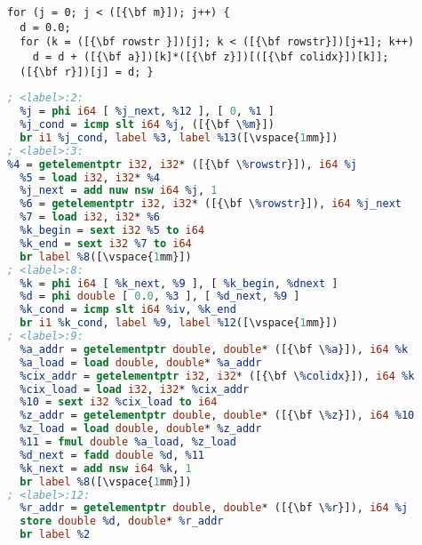 \begin{lstlisting}[language=MyCpp, basicstyle=\linespread{0.75}\small\ttfamily]
for (j = 0; j < ([{\bf m}]); j++) {
  d = 0.0;
  for (k = ([{\bf rowstr }])[j]; k < ([{\bf rowstr}])[j+1]; k++)
    d = d + ([{\bf a}])[k]*([{\bf z}])[([{\bf colidx}])[k]];
  ([{\bf r}])[j] = d; }
\end{lstlisting}
\vspace{-4.4mm}
\begin{lstlisting}[language={LLVM}, basicstyle=\linespread{0.75}\tiny\ttfamily,
                   label={fig:spmvexample1}, caption={Sparse linear algebra in C and LLVM IR}]
; <label>:2:
  %j = phi i64 [ %j_next, %12 ], [ 0, %1 ]
  %j_cond = icmp slt i64 %j, ([{\bf \%m}])
  br i1 %j_cond, label %3, label %13([\vspace{1mm}])
; <label>:3:
%4 = getelementptr i32, i32* ([{\bf \%rowstr}]), i64 %j
  %5 = load i32, i32* %4
  %j_next = add nuw nsw i64 %j, 1
  %6 = getelementptr i32, i32* ([{\bf \%rowstr}]), i64 %j_next
  %7 = load i32, i32* %6
  %k_begin = sext i32 %5 to i64
  %k_end = sext i32 %7 to i64
  br label %8([\vspace{1mm}])
; <label>:8:
  %k = phi i64 [ %k_next, %9 ], [ %k_begin, %dnext ]
  %d = phi double [ 0.0, %3 ], [ %d_next, %9 ]
  %k_cond = icmp slt i64 %iv, %k_end
  br i1 %k_cond, label %9, label %12([\vspace{1mm}])
; <label>:9:
  %a_addr = getelementptr double, double* ([{\bf \%a}]), i64 %k
  %a_load = load double, double* %a_addr
  %cix_addr = getelementptr i32, i32* ([{\bf \%colidx}]), i64 %k
  %cix_load = load i32, i32* %cix_addr
  %10 = sext i32 %cix_load to i64
  %z_addr = getelementptr double, double* ([{\bf \%z}]), i64 %10
  %z_load = load double, double* %z_addr
  %11 = fmul double %a_load, %z_load
  %d_next = fadd double %d, %11
  %k_next = add nsw i64 %k, 1
  br label %8([\vspace{1mm}])
; <label>:12:
  %r_addr = getelementptr double, double* ([{\bf \%r}]), i64 %j
  store double %d, double* %r_addr
  br label %2
\end{lstlisting}
\vspace{-0.287cm}

